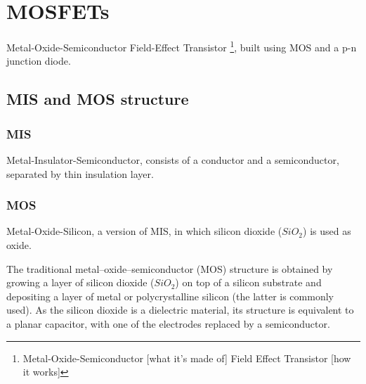 \documentclass[main]{subfiles}
\begin{document}

\section{MOSFETs}
Metal-Oxide-Semiconductor Field-Effect Transistor \footnote{Metal-Oxide-Semiconductor [what it's made of] Field Effect Transistor [how it works]}, built using MOS and a p-n junction diode.

\subsection{MIS and MOS structure}

\subsubsection{MIS}  Metal-Insulator-Semiconductor, consists of a conductor and a semiconductor, separated by thin insulation layer.
\subsubsection{MOS}  Metal-Oxide-Silicon, a version of MIS, in which silicon dioxide ($SiO_2$) is used as oxide.

The traditional metal–oxide–semiconductor (MOS) structure is obtained by growing a layer of silicon dioxide ($SiO_2$) on top of a silicon substrate and depositing a layer of metal or polycrystalline silicon (the latter is commonly used). As the silicon dioxide is a dielectric material, its structure is equivalent to a planar capacitor, with one of the electrodes replaced by a semiconductor.
\end{document}

